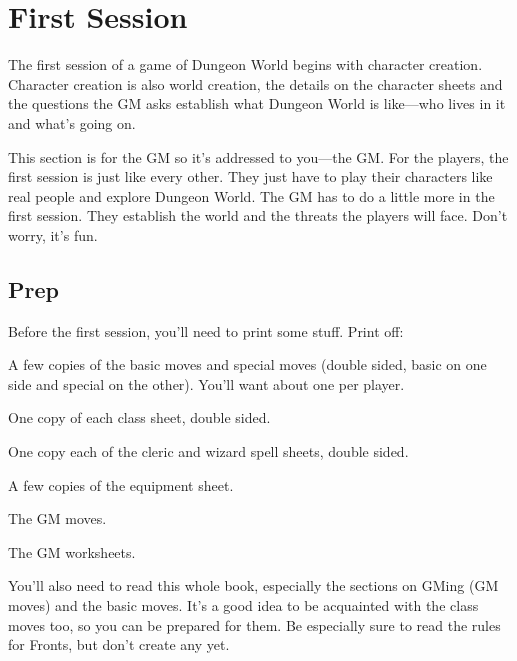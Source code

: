 \chapter{First Session}
  
            

The first session of a game of Dungeon World begins with character creation. Character creation is also world creation, the details on the character sheets and the questions the GM asks establish what Dungeon World is like—who lives in it and what's going on.

       

This section is for the GM so it's addressed to you—the GM. For the players, the first session is just like every other. They just have to play their characters like real people and explore Dungeon World. The GM has to do a little more in the first session. They establish the world and the threats the players will face. Don't worry, it's fun.

       
\section{Prep}   
       

Before the first session, you'll need to print some stuff. Print off:

       
\startitemize[1,packed]
         
\item A few copies of the basic moves and special moves (double sided, basic on one side and special on the other). You'll want about one per player.

         
\item One copy of each class sheet, double sided.

         
\item One copy each of the cleric and wizard spell sheets, double sided.

         
\item A few copies of the equipment sheet.

         
\item The GM moves.

         
\item The GM worksheets.

       
\stopitemize
       

You'll also need to read this whole book, especially the sections on GMing (GM moves) and the basic moves. It's a good idea to be acquainted with the class moves too, so you can be prepared for them. Be especially sure to read the rules for Fronts, but don't create any yet.

